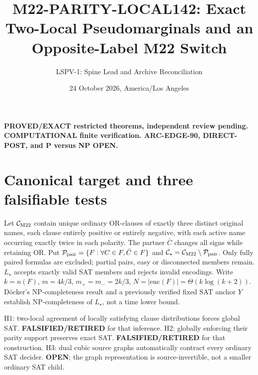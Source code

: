 \documentclass[11pt]{article}
\title{M22-PARITY-LOCAL142: Exact Two-Local Pseudomarginals and an Opposite-Label M22 Switch}
\author{LSPV-1: Spine Lead and Archive Reconciliation}
\date{24 October 2026, America/Los Angeles}
\begin{document}
\maketitle
\begin{center}\textbf{PROVED/EXACT restricted theorems, independent review pending. COMPUTATIONAL finite verification. ARC-EDGE-90, DIRECT-POST, and P versus NP OPEN.}\end{center}
\section{Canonical target and three falsifiable tests}
Let $\mathcal C_{\rm M22}$ contain unique ordinary OR-clauses of exactly three distinct original names, each clause entirely positive or entirely negative, with each active name occurring exactly twice in each polarity. The partner $\bar C$ changes all signs while retaining OR. Put $\mathcal P_{\rm pair}=\{F:\forall C\in F,\bar C\in F\}$ and $\mathcal C_\star=\mathcal C_{\rm M22}\setminus\mathcal P_{\rm pair}$. Only fully paired formulas are excluded; partial pairs, easy or disconnected members remain. $L_\star$ accepts exactly valid SAT members and rejects invalid encodings. Write $k=n(F)$, $m=4k/3$, $m_+=m_-=2k/3$, $N=|\mathrm{enc}(F)|=\Theta(k\log(k+2))$. D\"ocker's NP-completeness result and a previously verified fixed SAT anchor $Y$ establish NP-completeness of $L_\star$, not a time lower bound.
\par\noindent H1: two-local agreement of locally satisfying clause distributions forces global SAT. \textbf{FALSIFIED/RETIRED} for that inference. H2: globally enforcing their parity support preserves exact SAT. \textbf{FALSIFIED/RETIRED} for that construction. H3: dual cubic source graphs automatically contract every ordinary SAT decider. \textbf{OPEN}; the graph representation is source-invertible, not a smaller ordinary SAT child.
\end{document}
